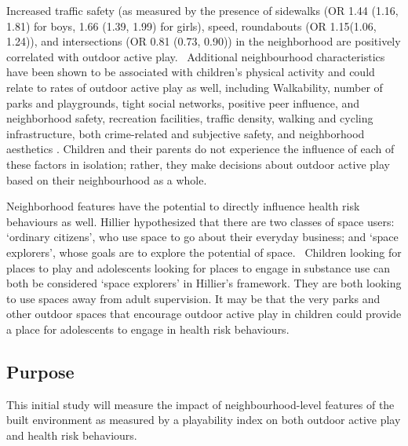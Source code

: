 \documentclass [11pt]{article}
\begin{document}
Increased traffic safety (as measured by the presence of sidewalks (OR 1.44 (1.16, 1.81) for boys, 1.66 (1.39, 1.99) for girls), speed, roundabouts (OR 1.15(1.06, 1.24)), and intersections (OR 0.81 (0.73, 0.90)) in the neighborhood are positively correlated with outdoor active play.~\cite{Aarts2010-pk,Aarts2012-dt} Additional neighbourhood characteristics have been shown to be associated with children's physical activity and could relate to rates of outdoor active play as well, including Walkability, number of parks and playgrounds, tight social networks, positive peer influence, and neighborhood safety, recreation facilities, traffic density, walking and cycling infrastructure, both crime-related and subjective safety, and neighborhood aesthetics \cite{Timperio2015-wn}. Children and their parents do not experience the influence of each of these factors in isolation; rather, they make decisions about outdoor active play based on their neighbourhood as a whole. 

Neighborhood features have the potential to directly influence health risk behaviours as well. Hillier hypothesized that there are two classes of space users: `ordinary citizens', who use space to go about their everyday business; and `space explorers', whose goals are to explore the potential of space.~\cite{Wallace2017-kj,Spilkova2014-iv,noauthor_undated-pd} Children looking for places to play and adolescents looking for places to engage in substance use can both be considered `space explorers' in Hillier's framework. They are both looking to use spaces away from adult supervision. It may be that the very parks and other outdoor spaces that encourage outdoor active play in children could provide a place for adolescents to engage in health risk behaviours. 

\subsection{Purpose}

This initial study will measure the impact of neighbourhood-level features of the built environment as measured by a playability index on both outdoor active play and health risk behaviours. 
\end{document}
